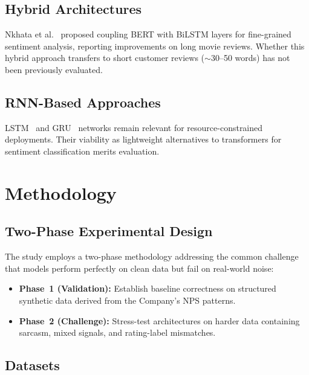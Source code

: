 \documentclass[10pt,twocolumn,a4paper]{article}
\begin{document}
\subsection{Hybrid Architectures}
Nkhata et al.~\cite{nkhata2025finetuning} proposed coupling BERT with BiLSTM layers for fine-grained sentiment analysis, reporting improvements on long movie reviews. Whether this hybrid approach transfers to short customer reviews ($\sim$30--50 words) has not been previously evaluated.

\subsection{RNN-Based Approaches}
LSTM~\cite{hochreiter1997long} and GRU~\cite{cho2014learning} networks remain relevant for resource-constrained deployments. Their viability as lightweight alternatives to transformers for sentiment classification merits evaluation.

\section{Methodology}
\label{sec:methodology}

\subsection{Two-Phase Experimental Design}

The study employs a two-phase methodology addressing the common challenge that models perform perfectly on clean data but fail on real-world noise:

\begin{itemize}[leftmargin=*,noitemsep,topsep=2pt]
    \item \textbf{Phase~1 (Validation):} Establish baseline correctness on structured synthetic data derived from the Company's NPS patterns.
    \item \textbf{Phase~2 (Challenge):} Stress-test architectures on harder data containing sarcasm, mixed signals, and rating-label mismatches.
\end{itemize}

\subsection{Datasets}
\end{document}
